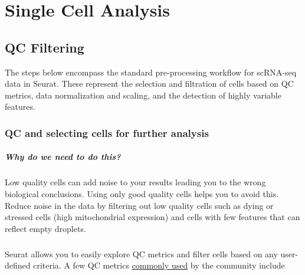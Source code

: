 \documentclass[
]{book}
\begin{document}
\part{Single Cell Analysis}\label{part-single-cell-analysis}

\chapter{QC Filtering}\label{qc}

The steps below encompass the standard pre-processing workflow for scRNA-seq data in Seurat. These represent the selection and filtration of cells based on QC metrics, data normalization and scaling, and the detection of highly variable features.

\section{QC and selecting cells for further analysis}\label{qc-and-selecting-cells-for-further-analysis}

\subsubsection*{Why do we need to do this?}\label{why-do-we-need-to-do-this}

Low quality cells can add noise to your results leading you to the wrong biological conclusions. Using only good quality cells helps you to avoid this. Reduce noise in the data by filtering out low quality cells such as dying or stressed cells (high mitochondrial expression) and cells with few features that can reflect empty droplets.

\subsubsection*{}\label{section-1}

Seurat allows you to easily explore QC metrics and filter cells based on any user-defined criteria. A few QC metrics \href{https://www.ncbi.nlm.nih.gov/pmc/articles/PMC4758103/}{commonly used} by the community include
\end{document}
